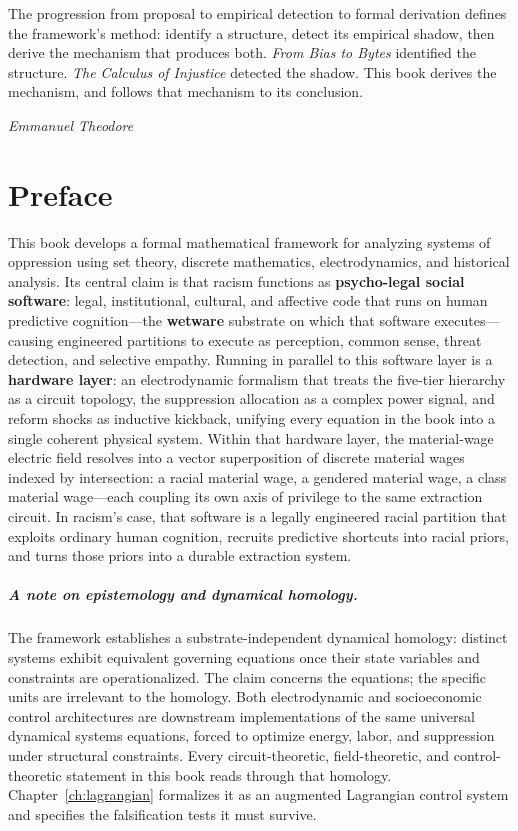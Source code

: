 \documentclass[12pt,openany]{book}
\numberwithin{equation}{chapter}
\begin{document}
The progression from proposal to empirical detection to formal derivation defines the framework's method: identify a structure, detect its empirical shadow, then derive the mechanism that produces both. \textit{From Bias to Bytes} identified the structure. \textit{The Calculus of Injustice} detected the shadow. This book derives the mechanism, and follows that mechanism to its conclusion.

\bigskip
\noindent\textit{Emmanuel Theodore}

\cleardoublepage

\chapter*{Preface}

This book develops a formal mathematical framework for analyzing systems of oppression using set theory, discrete mathematics, electrodynamics, and historical analysis. Its central claim is that racism functions as \textbf{psycho-legal social software}: legal, institutional, cultural, and affective code that runs on human predictive cognition---the \textbf{wetware} substrate on which that software executes---causing engineered partitions to execute as perception, common sense, threat detection, and selective empathy. Running in parallel to this software layer is a \textbf{hardware layer}: an electrodynamic formalism that treats the five-tier hierarchy as a circuit topology, the suppression allocation as a complex power signal, and reform shocks as inductive kickback, unifying every equation in the book into a single coherent physical system. Within that hardware layer, the material-wage electric field resolves into a vector superposition of discrete material wages indexed by intersection: a racial material wage, a gendered material wage, a class material wage---each coupling its own axis of privilege to the same extraction circuit. In racism's case, that software is a legally engineered racial partition that exploits ordinary human cognition, recruits predictive shortcuts into racial priors, and turns those priors into a durable extraction system.

\paragraph{A note on epistemology and dynamical homology.}
The framework establishes a substrate-independent dynamical homology: distinct systems exhibit equivalent governing equations once their state variables and constraints are operationalized. The claim concerns the equations; the specific units are irrelevant to the homology. Both electrodynamic and socioeconomic control architectures are downstream implementations of the same universal dynamical systems equations, forced to optimize energy, labor, and suppression under structural constraints. Every circuit-theoretic, field-theoretic, and control-theoretic statement in this book reads through that homology. Chapter~\ref{ch:lagrangian} formalizes it as an augmented Lagrangian control system and specifies the falsification tests it must survive.
\end{document}
